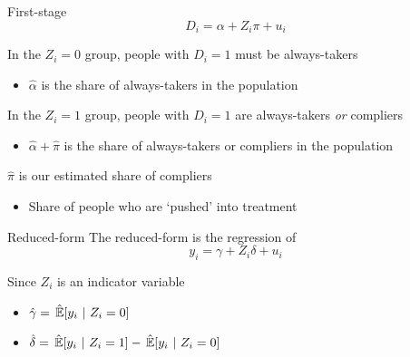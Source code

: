 \documentclass[aspectratio=169,t,11pt,table]{beamer}
\begin{document}
\begin{frame}{First-stage}
  \vspace*{-\bigskipamount}
  $$
    D_i = \alpha + Z_i \pi + u_i
  $$

  In the $Z_i = 0$ group, people with $D_i = 1$ must be always-takers
  \begin{itemize}
    \item $\hat{\alpha}$ is the share of always-takers in the population
  \end{itemize}
  
  \pause
  \bigskip
  In the $Z_i = 1$ group, people with $D_i = 1$ are always-takers \emph{or} compliers
  \begin{itemize}
    \item $\hat{\alpha} + \hat{\pi}$ is the share of always-takers or compliers in the population
  \end{itemize}

  \bigskip
  \pause
  $\hat{\pi}$ is our estimated share of compliers
  \begin{itemize}
    \item Share of people who are `pushed' into treatment
  \end{itemize}
\end{frame}

\begin{frame}{Reduced-form}
  The reduced-form is the regression of 
  $$
    y_i = \gamma + Z_i \delta + u_i
  $$

  Since $Z_i$ is an indicator variable
  \begin{itemize}
    \item $\hat{\gamma} = \expechat{y_i}{Z_i = 0}$
    \item $\hat{\delta} = \expechat{y_i}{Z_i = 1} - \expechat{y_i}{Z_i = 0}$ 
  \end{itemize}
\end{frame}
\end{document}

